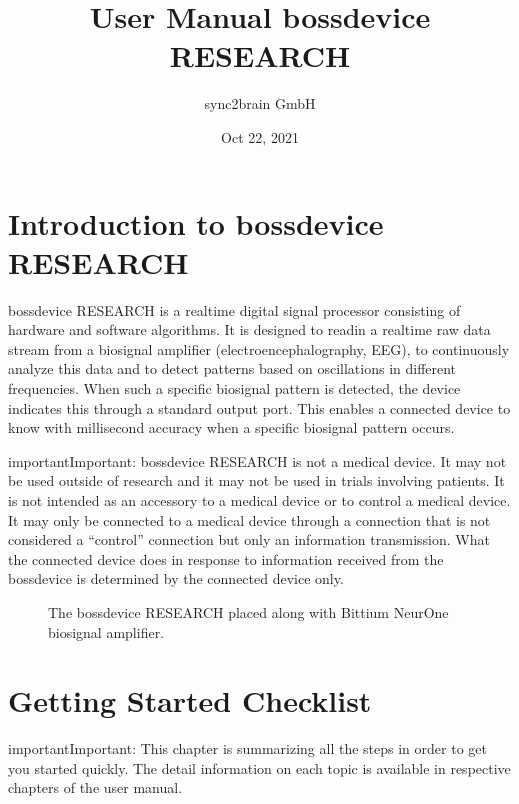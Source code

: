 \documentclass[letterpaper,10pt,english]{sphinxmanual}
\title{User Manual \sphinxhyphen{} bossdevice RESEARCH}
\date{Oct 22, 2021}
\author{sync2brain GmbH}
\begin{document}
\pagestyle{empty}
\sphinxmaketitle
\pagestyle{plain}
\sphinxtableofcontents
\pagestyle{normal}
\label{\detokenize{index::doc}}



\chapter{Introduction to bossdevice RESEARCH}
\label{\detokenize{1_introduction_to_bossdevice_research:introduction-to-bossdevice-research}}\label{\detokenize{1_introduction_to_bossdevice_research::doc}}
\sphinxAtStartPar
bossdevice RESEARCH is a real\sphinxhyphen{}time digital signal processor consisting of hardware and software algorithms. It is designed to read\sphinxhyphen{}in a real\sphinxhyphen{}time raw data stream from a biosignal amplifier (electroencephalography, EEG), to continuously analyze this data and to detect patterns based on oscillations in different frequencies. When such a specific bio\sphinxhyphen{}signal pattern is detected, the device indicates this through a standard output port. This enables a connected device to know with millisecond accuracy when a specific bio\sphinxhyphen{}signal pattern occurs.

\begin{sphinxadmonition}{important}{Important:}
\sphinxAtStartPar
bossdevice RESEARCH is not a medical device. It may not be used outside of research
and it may not be used in trials involving patients. It is not intended as an accessory
to a medical device or to control a medical device. It may only be connected to a
medical device through a connection that is not considered a “control” connection
but only an information transmission. What the connected device does in response
to information received from the bossdevice is determined by the connected device
only.
\end{sphinxadmonition}

\begin{figure}[htbp]
\centering
\capstart

\noindent{}
\caption{The bossdevice RESEARCH placed along with Bittium NeurOne biosignal amplifier.}\label{\detokenize{1_introduction_to_bossdevice_research:id1}}\end{figure}


\chapter{Getting Started \sphinxhyphen{} Checklist}
\label{\detokenize{1b_GettingStartedCheckList:getting-started-checklist}}\label{\detokenize{1b_GettingStartedCheckList::doc}}
\begin{sphinxadmonition}{important}{Important:}
\sphinxAtStartPar
This chapter is summarizing all the steps in order to get you started quickly. The detail information on each topic is available in respective chapters of the user manual.
\end{sphinxadmonition}
\end{document}
